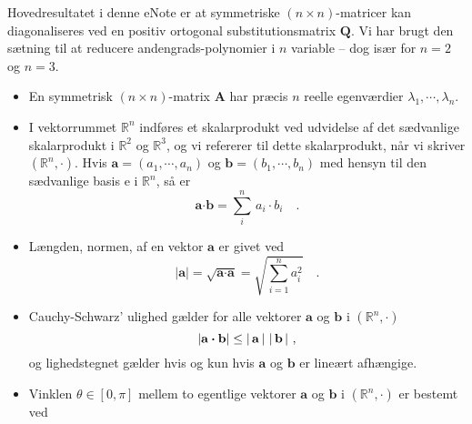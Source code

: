 



\begin{summary}
Hovedresultatet i denne eNote er at symmetriske $(n \times n)$-matricer kan diagonaliseres ved en positiv ortogonal substitutionsmatrix $\mathbf{Q}$. Vi har brugt den sætning til at reducere andengrads-polynomier i $n$ variable -- dog især for $n = 2$ og $n=3$.
\begin{itemize}
\item En symmetrisk $(n \times n)$-matrix $\mathbf{A}$  har præcis $n$ reelle egenværdier $\lambda_{1}, \cdots , \lambda_{n}$.
\item I vektorrummet $\mathbb{R}^{n}$ indføres et skalarprodukt ved udvidelse af det sædvanlige skalarprodukt i $\mathbb{R}^{2}$ og $\mathbb{R}^{3}$, og vi refererer til dette skalarprodukt, når vi skriver $(\mathbb{R}^{n}, \bm{\cdot})$. Hvis $\mathbf{a} = (a_{1}, \cdots , a_{n})$ og $\mathbf{b} = (b_{1}, \cdots , b_{n})$ med hensyn til den sædvanlige basis e i $\mathbb{R}^{n}$, så er
\begin{equation}
\mathbf{a}\bm{\cdot}\mathbf{b} = \sum_{i}^{n}\, a_{i}\cdot b_{i} \quad.
\end{equation}
\item Længden, normen, af en vektor $\mathbf{a}$ er givet ved
\begin{equation}
\vert \mathbf{a} \vert = \sqrt{\mathbf{a} \bm{\cdot} \mathbf{a}} = \sqrt{\sum_{i=1}^{n}a_{i}^{2}} \quad.
\end{equation}
\item Cauchy-Schwarz' ulighed gælder for alle vektorer $\mathbf{a}$ og $\mathbf{b}$ i $(\mathbb{R}^{n}, \bm{\cdot})$
\begin{equation}
\left|\mathbf{a} \bm{\cdot} \mathbf{b}\right| \leq \left|\,\mathbf{a}\,\right|\,\left|\,\mathbf{b}\,\right|\, ,
\end{equation}
og lighedstegnet gælder hvis og kun hvis $\mathbf{a}$ og $\mathbf{b}$ er lineært afhængige.
\item Vinklen $\theta \in [0, \pi]$ mellem to egentlige vektorer $\mathbf{a}$ og $\mathbf{b}$ i $(\mathbb{R}^{n}, \bm{\cdot})$ er bestemt ved 

\end{itemize}
\end{summary}
